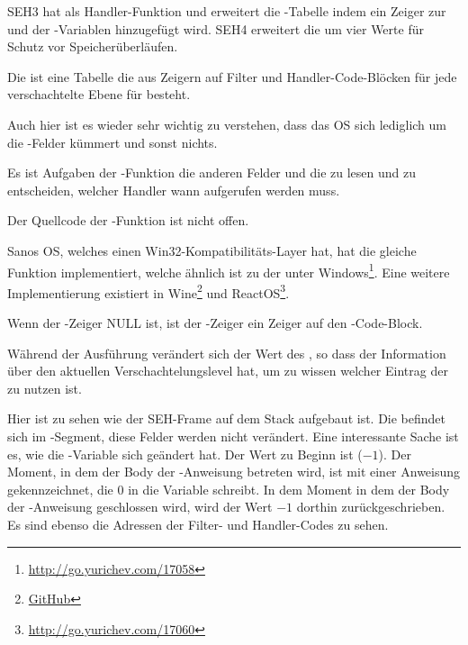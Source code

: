 
SEH3 hat  als Handler-Funktion und erweitert die
-Tabelle indem ein Zeiger zur  und
der -Variablen hinzugefügt wird.
SEH4 erweitert die  um vier Werte für Schutz vor Speicherüberläufen.

Die  ist eine Tabelle die aus Zeigern auf Filter und Handler-Code-Blöcken
für jede verschachtelte Ebene für  besteht.



Auch hier ist es wieder sehr wichtig zu verstehen, dass das \ac{OS} sich lediglich
um die -Felder kümmert und sonst nichts.

Es ist Aufgaben der -Funktion die anderen Felder und die
 zu lesen und zu entscheiden, welcher Handler wann aufgerufen
werden muss.

Der Quellcode der -Funktion ist nicht offen.

Sanos OS, welches einen Win32-Kompatibilitäts-Layer hat, hat die gleiche Funktion
implementiert, welche ähnlich ist zu der unter Windows\footnote{\url{http://go.yurichev.com/17058}}.
Eine weitere Implementierung existiert in Wine\footnote{\href{http://go.yurichev.com/17059}{GitHub}}
und ReactOS\footnote{\url{http://go.yurichev.com/17060}}.

Wenn der -Zeiger NULL ist, ist der -Zeiger ein Zeiger auf
den -Code-Block.

Während der Ausführung verändert sich der Wert des , so dass
der  Information über den aktuellen Verschachtelungslevel
hat, um zu wissen welcher Eintrag der  zu nutzen ist.






Hier ist zu sehen wie der SEH-Frame auf dem Stack aufgebaut ist.
Die  befindet sich im -Segment, diese Felder werden
nicht verändert.
Eine interessante Sache ist es, wie die -Variable sich geändert hat.
Der Wert zu Beginn ist  ($-1$).
Der Moment, in dem der Body der -Anweisung betreten wird, ist mit einer Anweisung
gekennzeichnet, die 0 in die Variable schreibt.
In dem Moment in dem der Body der -Anweisung geschlossen wird, wird der Wert $-1$
dorthin zurückgeschrieben.
Es sind ebenso die Adressen der Filter- und Handler-Codes zu sehen.

